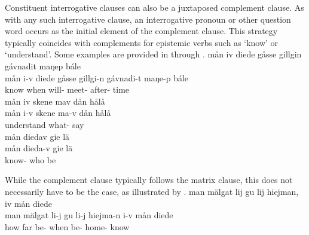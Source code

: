 Constituent interrogative clauses can also be a juxtaposed complement clause. As with any such interrogative clause, an interrogative pronoun or other question word occurs as the initial element of the complement clause. %
This strategy typically coincides with complements for epistemic verbs such as  ‘know’ or  ‘understand’. %
Some examples are provided in  through . 
\ea\label{Qsubordination1}
\glll	mån iv diede gåsse gillgin gávnadit maŋep bále\\
	mån i-v diede gåsse gillgi-n gávnadi-t maŋe-p bále\\
	  know\BS{} when will- meet- after- time\BS{}\\\nopagebreak
{} 
\z
\ea\label{Qsubordination2}
\glll	mån iv skene mav dån hålå\\
	mån i-v skene ma-v dån hålå\\
	  understand\BS{} what-  say\BS{}\\\nopagebreak
{} 
\z
\ea\label{Qsubordination3}
\glll	mån diedav gie lä\\
	mån dieda-v gie lä\\
	 know- who\BS{} be\BS{}\\\nopagebreak
{} 
\z

While the complement clause typically follows the matrix clause, this does not necessarily have to be the case, as illustrated by .%
\ea\label{Qsubordination4}
\glll	man mälgat lij gu lij hiejman, iv mån diede\\
	man mälgat li-j gu li-j hiejma-n i-v mån diede\\
	how far be- when be- home-   know\BS{}\\\nopagebreak
{} 
\z



